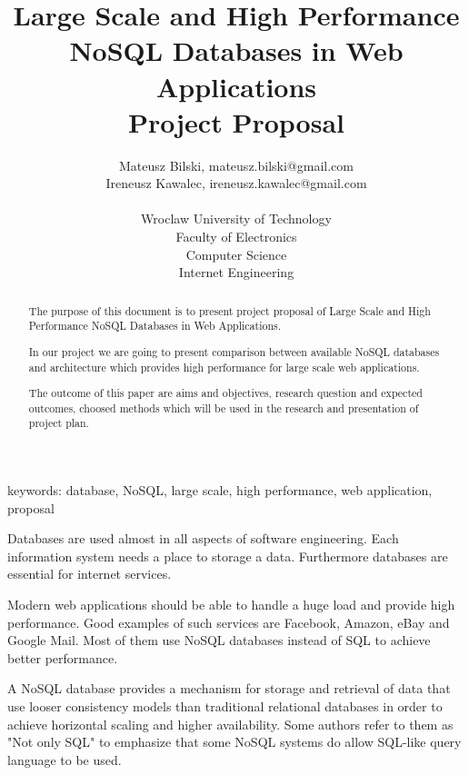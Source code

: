\documentclass[times, 10pt,twocolumn]{article}
\begin{document}
 

\title{Large Scale and High Performance NoSQL Databases in Web Applications \\ Project Proposal}
\author{Mateusz Bilski, mateusz.bilski@gmail.com \\ Ireneusz Kawalec, ireneusz.kawalec@gmail.com \\ \\
Wroclaw University of Technology\\ Faculty of Electronics \\ Computer Science \\ Internet Engineering  \\  
} 

\maketitle
\thispagestyle{empty} 

\begin{abstract}  

The purpose of this document is to present project proposal of Large Scale and High Performance NoSQL Databases in Web Applications. 

In our project we are going to present comparison between available NoSQL databases and architecture which
provides high performance for large scale web applications.

The outcome of this paper are aims and objectives, research question and expected outcomes, choosed methods which will be used in the research
and presentation of project plan. 

\end{abstract} 

keywords: database, NoSQL, large scale, high performance, web application, proposal


Databases are used almost in all aspects of software engineering. Each 
information system needs a place to storage a data. Furthermore databases are essential for internet services.

Modern web applications should be able to handle a huge load and provide high performance. 
Good examples of such services are Facebook, Amazon, eBay and Google Mail. Most of them use NoSQL databases
instead of SQL to achieve better performance.

A NoSQL database provides a mechanism for storage and retrieval of data that use looser consistency models 
than traditional relational databases in order to achieve horizontal scaling and higher availability. Some authors 
refer to them as "Not only SQL" to emphasize that some NoSQL systems do allow SQL-like query language to be used.
\end{document}
